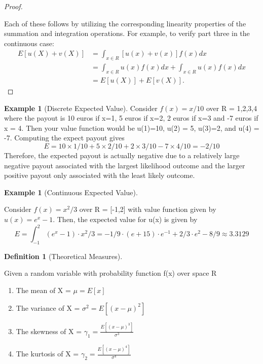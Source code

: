 \documentclass[10pt,]{book}
\theoremstyle{plain}
\theoremstyle{definition}
\newtheorem{definition}[theorem]{Definition}
\theoremstyle{definition}
\newtheorem{example}[theorem]{Example}
\theoremstyle{definition}
\numberwithin{equation}{section}
\begin{document}
\begin{proof}\hypertarget{proof-29}{}
Each of these follows by utilizing the corresponding linearity properties of the summation and integration operations. For example, to verify part three in the continuous case:
	\begin{align*}
E[u(X) + v(X)] & = \int_{x \in R} [u(x)+v(x)]f(x) dx\\
 & = \int_{x \in R} u(x)f(x) dx + \int_{x \in R} u(x)f(x) dx\\
 & = E[u(X)] + E[v(X)].
\end{align*}
\end{proof}
\begin{example}[Discrete Expected Value]\label{example-18}
Consider \(f(x) = x/10\) over R = {1,2,3,4} where the payout is 10 euros if x=1, 5 euros if x=2, 2 euros if x=3 and -7 euros if x = 4.  Then your value function would be u(1)=10, u(2) = 5, u(3)=2, and u(4) = -7. Computing the expect payout gives
	\begin{equation*}E = 10 \times 1/10 + 5 \times 2/10 + 2 \times 3/10 - 7 \times 4/10 = -2/10\end{equation*}
	Therefore, the expected payout is actually negative due to a relatively large negative payout associated with the largest likelihood outcome and the larger positive payout only associated with the least likely outcome.
\end{example}
\begin{example}[Continuous Expected Value]\label{example-19}

	Consider \(f(x) = x^2/3\) over R = [-1,2] with value function given by \(u(x) = e^x - 1\). Then, the expected value for u(x) is given by
	\begin{equation*}E = \int_{-1}^2 (e^x-1) \cdot x^2/3 = -1/9 \cdot (e + 15) \cdot e^{-1} + 2/3 \cdot e^2 - 8/9 \approx 3.3129\end{equation*}
\end{example}
\begin{definition}[{Theoretical Measures}]\label{definition-31}

	Given a random variable with probability function f(x) over space R
	\leavevmode%
\begin{enumerate}
\item\hypertarget{li-158}{}The mean of X = \(\mu = E[x]\)%
\item\hypertarget{li-159}{}The variance of X = \(\sigma^2 = E[(x-\mu)^2]\)%
\item\hypertarget{li-160}{}The skewness of X = \(\gamma_1 = \frac{E[(x-\mu)^3]}{\sigma^3}\)%
\item\hypertarget{li-161}{}The kurtosis of X = \(\gamma_2 = \frac{E[(x-\mu)^4]}{\sigma^4}\)%
\end{enumerate}

\end{definition}
\end{document}
